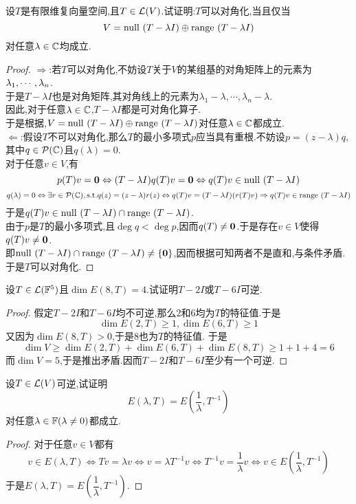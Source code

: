 \documentclass{ctexart}
\begin{document}
\begin{problem}[5.]
    设$T$是有限维复向量空间,且$T\in\mathcal{L}(V)$.试证明:$T$可以对角化,当且仅当
    \[V=\text{null }(T-\lambda I)\oplus\text{range }(T-\lambda I)\]
    对任意$\lambda\in\mathbb{C}$均成立.
\end{problem}
\begin{proof}
    $\Rightarrow$:若$T$可以对角化,不妨设$T$关于$V$的某组基的对角矩阵上的元素为${\lambda}_1,\cdots,{\lambda}_{n}$.\\
    于是$T-\lambda I$也是对角矩阵,其对角线上的元素为$\lambda_1-\lambda,\cdots,\lambda_n-\lambda$.\\
    因此,对于任意$\lambda\in\mathbb{C}$,$T-\lambda I$都是可对角化算子.\\
    于是根据,$V=\text{null }(T-\lambda I)\oplus\text{range }(T-\lambda I)$对任意$\lambda\in\mathbb{C}$都成立.\\
    $\Leftarrow$:假设$T$不可以对角化,那么$T$的最小多项式$p$应当具有重根.不妨设$p=(z-\lambda)q$,其中$q\in\mathcal{P}(\mathbb{C})$且$q(\lambda)=0$.\\
    对于任意$v\in V$,有
    \[p(T)v=\mathbf0\Leftrightarrow (T-\lambda I)q(T)v=\mathbf0\Leftrightarrow q(T)v\in\text{null }(T-\lambda I)\]
    \[q(\lambda)=0\Leftrightarrow\exists r\in\mathcal{P}(\mathbb{C}),\text{s.t.} q(z)=(z-\lambda)r(z)\Leftrightarrow q(T)v=(T-\lambda I)(r(T)v)\Rightarrow q(T)v\in\text{range }(T-\lambda I)\]
    于是$q(T)v\in\text{null }(T-\lambda I)\cap\text{range }(T-\lambda I)$.\\
    由于$p$是$T$的最小多项式,且$\deg q<\deg p$,因而$q(T)\neq\mathbf0$.于是存在$v\in V$使得$q(T)v\neq\mathbf0$.\\
    即$\text{null }(T-\lambda I)\cap\text{range }(T-\lambda I)\neq\{\mathbf0\}$,因而根据可知两者不是直和,与条件矛盾.于是$T$可以对角化.
\end{proof}
\begin{problem}[6.]
    设$T\in\mathcal{L}(\mathbb{F}^5)$且$\dim E(8,T)=4$.试证明$T-2I$或$T-6I$可逆.
\end{problem}
\begin{proof}
    假定$T-2I$和$T-6I$均不可逆,那么$2$和$6$均为$T$的特征值.于是
    \[\dim E(2,T)\geqslant 1,\dim E(6,T)\geqslant 1\]
    又因为$\dim E(8,T)>0$,于是$8$也为$T$的特征值.
    于是
    \[\dim V\geqslant\dim E(2,T)+\dim E(6,T)+\dim E(8,T)\geqslant 1+1+4=6\]
    而$\dim V=5$,于是推出矛盾.因而$T-2I$和$T-6I$至少有一个可逆.
\end{proof}
\begin{problem}[7.]
    设$T\in\mathcal{L}(V)$可逆,试证明
    \[E(\lambda,T)=E\left(\dfrac{1}{\lambda},T^{-1}\right)\]
    对任意$\lambda\in\mathbb{F}(\lambda\neq0)$都成立.
\end{problem}
\begin{proof}
    对于任意$v\in V$都有
    \[v\in E(\lambda,T)\Leftrightarrow Tv=\lambda v\Leftrightarrow v=\lambda T^{-1}v\Leftrightarrow T^{-1}v=\dfrac{1}{\lambda}v\Leftrightarrow v\in E\left(\dfrac{1}{\lambda},T^{-1}\right)\]
    于是$E(\lambda,T)=E\left(\dfrac{1}{\lambda},T^{-1}\right)$.
\end{proof}
\end{document}
